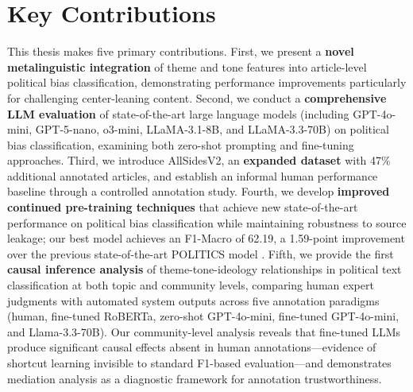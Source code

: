\section{Key Contributions}

This thesis makes five primary contributions. First, we present a \textbf{novel metalinguistic integration} of theme and tone features into article-level political bias classification, demonstrating performance improvements particularly for challenging center-leaning content. Second, we conduct a \textbf{comprehensive LLM evaluation} of state-of-the-art large language models (including GPT-4o-mini, GPT-5-nano, o3-mini, LLaMA-3.1-8B, and LLaMA-3.3-70B) on political bias classification, examining both zero-shot prompting and fine-tuning approaches. Third, we introduce AllSidesV2, an \textbf{expanded dataset} with 47\% additional annotated articles, and establish an informal human performance baseline through a controlled annotation study. Fourth, we develop \textbf{improved continued pre-training techniques} that achieve new state-of-the-art performance on political bias classification while maintaining robustness to source leakage; our best model achieves an F1-Macro of 62.19, a 1.59-point improvement over the previous state-of-the-art POLITICS model \citep{liu2022politics}. Fifth, we provide the first \textbf{causal inference analysis} of theme-tone-ideology relationships in political text classification at both topic and community levels, comparing human expert judgments with automated system outputs across five annotation paradigms (human, fine-tuned RoBERTa, zero-shot GPT-4o-mini, fine-tuned GPT-4o-mini, and Llama-3.3-70B). Our community-level analysis reveals that fine-tuned LLMs produce significant causal effects absent in human annotations---evidence of shortcut learning invisible to standard F1-based evaluation---and demonstrates mediation analysis as a diagnostic framework for annotation trustworthiness.

